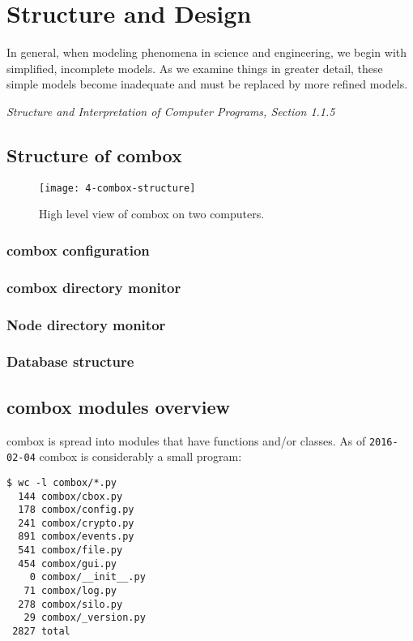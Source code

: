 \chapter{Structure and Design}

\epigraph{In general, when modeling phenomena in science and
  engineering, we begin with simplified, incomplete models. As we
  examine things in greater detail, these simple models become
  inadequate and must be replaced by more refined
  models.}{\textit{Structure and Interpretation of Computer Programs,
    Section 1.1.5}\cite{sicp}}

\section{Structure of combox}

\begin{figure}[h]
\texttt{[image: 4-combox-structure]}
\caption{High level view of combox on two computers.}
\label{fig:4-combox-structure}
\end{figure}

\subsection{combox configuration}

\subsection{combox directory monitor}

\subsection{Node directory monitor}

\subsection{Database structure}

\section{combox modules overview}

combox is spread into modules that have functions and/or classes. As
of \verb+2016-02-04+ combox is considerably a small program:

\begin{verbatim}
$ wc -l combox/*.py
  144 combox/cbox.py
  178 combox/config.py
  241 combox/crypto.py
  891 combox/events.py
  541 combox/file.py
  454 combox/gui.py
    0 combox/__init__.py
   71 combox/log.py
  278 combox/silo.py
   29 combox/_version.py
 2827 total
\end{verbatim}

